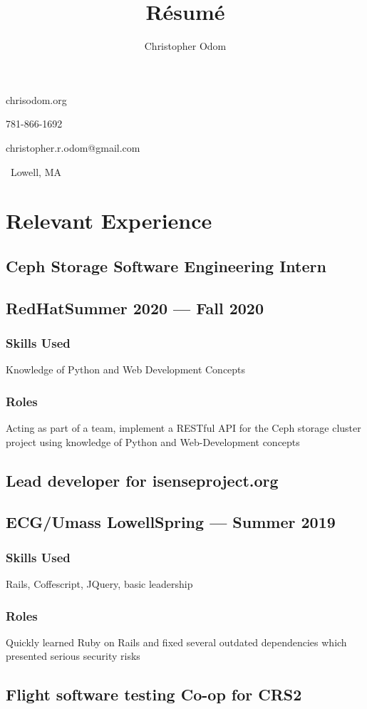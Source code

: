 \documentclass[11pt]{article}
\makeatletter
\newcommand\textbox[1]{%
	  \parbox{.333\textwidth}{#1}%
}
\renewcommand{\maketitle}
{
	\begin{center}\huge \theauthor\end{center}
	{\large\noindent\textbox{chrisodom.org\hfill}\textbox{\hfill}\textbox{\hfill781-866-1692}}

	{\large\noindent\textbox{christopher.r.odom@gmail.com\hfill}\textbox{\hfill}\textbox{\hfill\ Lowell, MA}}
}
\makeatother
\begin{document}
\title{R\'esum\'e}
\author{Christopher Odom}

\maketitle

\section{Relevant Experience}

\subsection{Ceph Storage Software Engineering Intern}
\subsection{RedHat\dotfill Summer 2020 --- Fall 2020}
\subsubsection{Skills Used} Knowledge of Python and Web Development Concepts
\subsubsection{Roles}
Acting as part of a team, implement a RESTful API for the Ceph storage
cluster project using knowledge of Python and Web-Development concepts

\subsection{Lead developer for isenseproject.org}
\subsection{ECG/Umass Lowell\dotfill Spring --- Summer 2019}
\subsubsection{Skills Used} Rails, Coffescript, JQuery, basic leadership
\subsubsection{Roles}
Quickly learned Ruby on Rails and fixed several outdated dependencies
which presented serious security risks

\subsection{Flight software testing Co-op for CRS2}
\end{document}
